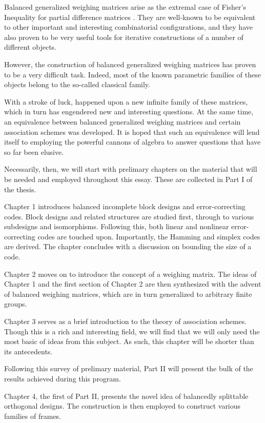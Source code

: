 \documentclass[../../main]{subfiles}
\begin{document}
 Balanced generalized weighing matrices arise as the extremal case of Fisher's Inequality for partial difference matrices \cite[see][]{jungnickel-kharaghani-bgw}. They are well-known to be equivalent to other important and interesting combinatorial configurations, and they have also proven to be very useful tools for iterative constructions of a number of different objects. 
 
 However, the construction of balanced generalized weighing matrices has proven to be a very difficult task. Indeed, most of the known parametric families of these objects belong to the so-called classical family. 
 
 With a stroke of luck, \cite{w-mat-construct} happened upon a new infinite family of these matrices, which in turn has engendered new and interesting questions. At the same time, an equivalence between balanced generalized weighing matrices and certain association schemes was developed. It is hoped that such an equivalence will lend itself to employing the powerful cannons of algebra to answer questions that have so far been elusive.
 
 Necessarily, then, we will start with prelimary chapters on the material that will be needed and employed throughout this essay. These are collected in Part I of the thesis. 
 
 Chapter 1 introduces balanced incomplete block designs and error-correcting codes. Block designs and related structures are studied first, through to various subdesigns and isomorphisms. Following this, both linear and nonlinear error-correcting codes are touched upon. Importantly, the Hamming and simplex codes are derived. The chapter concludes with a discussion on bounding the size of a code.
 
 Chapter 2 moves on to introduce the concept of a weighing matrix. The ideas of Chapter 1 and the first section of Chapter 2 are then synthesized with the advent of balanced weighing matrices, which are in turn generalized to arbitrary finite groups.
 
 Chapter 3 serves as a brief introduction to the theory of association schemes. Though this is a rich and interesting field, we will find that we will only need the most basic of ideas from this subject. As such, this chapter will be shorter than its antecedents.
 
 Following this survey of prelimary material, Part II will present the bulk of the results achieved during this program. 
 
 Chapter 4, the first of Part II, presents the novel idea of balancedly splittable orthogonal designs. The construction is then employed to construct various families of frames.
 
\end{document}
